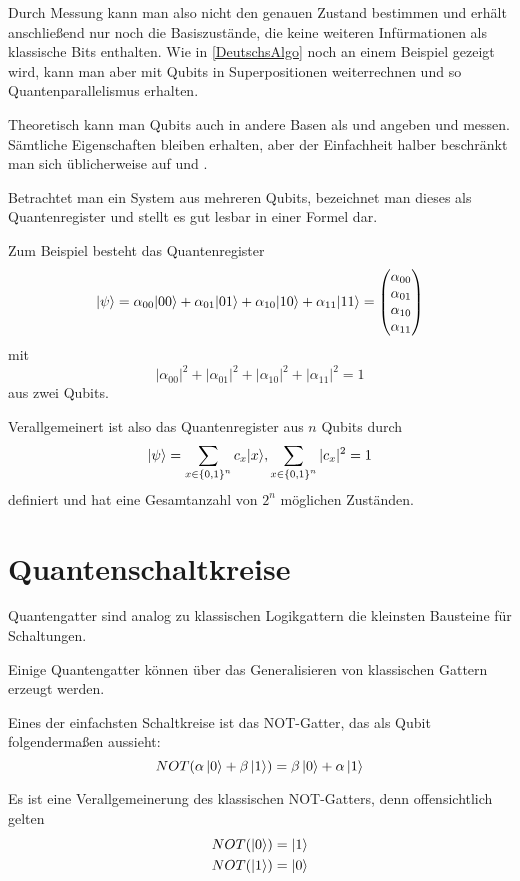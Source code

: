 \documentclass{acm_proc_article-sp}
\begin{document}
Durch Messung kann man also nicht den genauen Zustand bestimmen und erhält anschließend nur noch die Basiszustände,
die keine weiteren Infürmationen als klassische Bits enthalten.
Wie in \autoref{DeutschsAlgo} noch an einem Beispiel gezeigt wird, kann man aber mit Qubits in Superpositionen
weiterrechnen und so Quantenparallelismus erhalten.

Theoretisch kann man Qubits auch in andere Basen als  und  angeben und messen. Sämtliche Eigenschaften
bleiben erhalten, aber der Einfachheit halber beschränkt man sich üblicherweise auf  und .

Betrachtet man ein System aus mehreren Qubits, bezeichnet man dieses als Quantenregister und stellt es
gut lesbar in einer Formel dar.

Zum Beispiel besteht das Quantenregister 
\[
    \left|\psi\right\rangle = \alpha_{00} |00\rangle + \alpha_{01} |01\rangle + \alpha_{10} |10\rangle + \alpha_{11} |11\rangle = 
\begin{pmatrix}
    \alpha_{00}  \\
    \alpha_{01}  \\
    \alpha_{10}  \\
    \alpha_{11}  \\
\end{pmatrix}
\]
mit
\[
    |\alpha_{00}|^2 + |\alpha_{01}|^2 + |\alpha_{10}|^2 + |\alpha_{11}|^2 = 1
\]
aus zwei Qubits.

Verallgemeinert ist also das Quantenregister aus $n$ Qubits durch
\[
    \left|\psi\right\rangle = \sum_{x \in {\{0,1\}}^n} c_{x} |x\rangle,
    \sum_{x \in {\{0,1\}}^n} |c_x|^2 = 1
\]
definiert und hat eine Gesamtanzahl von $2^n$ möglichen Zuständen.

\section{Quantenschaltkreise}
\label{qcircuits}

Quantengatter sind analog zu klassischen Logikgattern die kleinsten Bausteine für Schaltungen.

Einige Quantengatter können über das Generalisieren von klassischen Gattern erzeugt werden.

Eines der einfachsten Schaltkreise ist das NOT-Gatter, das als Qubit folgendermaßen aussieht:
    \[NOT(\alpha \left|0\right\rangle + \beta \left|1\right\rangle)  = \beta \left|0\right\rangle + \alpha \left|1\right\rangle\]

Es ist eine Verallgemeinerung des klassischen NOT-Gatters, denn offensichtlich gelten
\begin{align*}
    NOT(\left|0\right\rangle) &= \left|1\right\rangle \\
    NOT(\left|1\right\rangle) &= \left|0\right\rangle
\end{align*}
\end{document}
